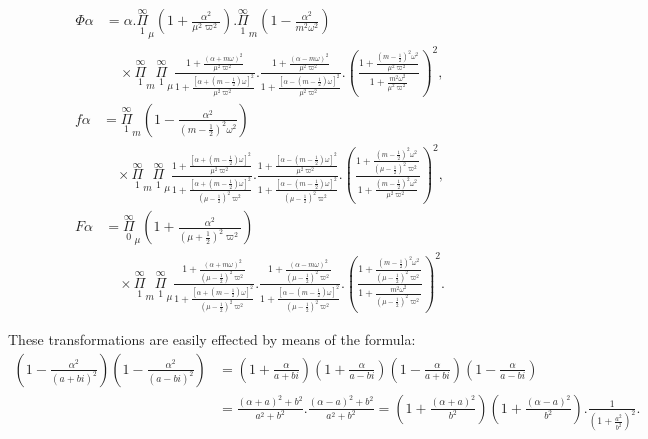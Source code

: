 \documentclass{article}
\begin{document}
\[
\begin{aligned}
\Phi\alpha &= \alpha.\overset{\infty}{\underset{1}{\Pi}}_{\mu}\left(1+\frac{\alpha^{2}}{\mu^{2}\varpi^{2}}\right).\overset{\infty}{\underset{1}{\Pi}}_{m}\left(1-\frac{\alpha^{2}}{m^{2}\omega^{2}}\right)\\
&\quad\times\overset{\infty}{\underset{1}{\Pi}}_{m}\overset{\infty}{\underset{1}{\Pi}}_{\mu}\frac{1+\frac{(\alpha+m\omega)^{2}}{\mu^{2}\varpi^{2}}}{1+\frac{[\alpha+(m-\tfrac{1}{2})\omega]^{2}}{\mu^{2}\varpi^{2}}}.\frac{1+\frac{(\alpha-m\omega)^{2}}{\mu^{2}\varpi^{2}}}{1+\frac{[\alpha-(m-\tfrac{1}{2})\omega]^{2}}{\mu^{2}\varpi^{2}}}.\left(\frac{1+\frac{(m-\tfrac{1}{2})^{2}\omega^{2}}{\mu^{2}\varpi^{2}}}{1+\frac{m^{2}\omega^{2}}{\mu^{2}\varpi^{2}}}\right)^{2},
\end{aligned}
\tag{178.}
\]
\[
\begin{aligned}
f\alpha &= \overset{\infty}{\underset{1}{\Pi}}_{m}\left(1-\frac{\alpha^{2}}{(m-\tfrac{1}{2})^{2}\omega^{2}}\right)\\
&\quad\times\overset{\infty}{\underset{1}{\Pi}}_{m}\overset{\infty}{\underset{1}{\Pi}}_{\mu}\frac{1+\frac{[\alpha+(m-\tfrac{1}{2})\omega]^{2}}{\mu^{2}\varpi^{2}}}{1+\frac{[\alpha+(m-\tfrac{1}{2})\omega]^{2}}{(\mu-\tfrac{1}{2})^{2}\varpi^{2}}}.\frac{1+\frac{[\alpha-(m-\tfrac{1}{2})\omega]^{2}}{\mu^{2}\varpi^{2}}}{1+\frac{[\alpha-(m-\tfrac{1}{2})\omega]^{2}}{(\mu-\tfrac{1}{2})^{2}\varpi^{2}}}.\left(\frac{1+\frac{(m-\tfrac{1}{2})^{2}\omega^{2}}{(\mu-\tfrac{1}{2})^{2}\varpi^{2}}}{1+\frac{(m-\tfrac{1}{2})^{2}\omega^{2}}{\mu^{2}\varpi^{2}}}\right)^{2},
\end{aligned}
\tag{179.}
\]
\[
\begin{aligned}
F\alpha &= \overset{\infty}{\underset{0}{\Pi}}_{\mu}\left(1+\frac{\alpha^{2}}{(\mu+\tfrac{1}{2})^{2}\varpi^{2}}\right)\\
&\quad\times\overset{\infty}{\underset{1}{\Pi}}_{m}\overset{\infty}{\underset{1}{\Pi}}_{\mu}\frac{1+\frac{(\alpha+m\omega)^{2}}{(\mu-\tfrac{1}{2})^{2}\varpi^{2}}}{1+\frac{[\alpha+(m-\tfrac{1}{2})\omega]^{2}}{(\mu-\tfrac{1}{2})^{2}\varpi^{2}}}.\frac{1+\frac{(\alpha-m\omega)^{2}}{(\mu-\tfrac{1}{2})^{2}\varpi^{2}}}{1+\frac{[\alpha-(m-\tfrac{1}{2})\omega]^{2}}{(\mu-\tfrac{1}{2})^{2}\varpi^{2}}}.\left(\frac{1+\frac{(m-\tfrac{1}{2})^{2}\omega^{2}}{(\mu-\tfrac{1}{2})^{2}\varpi^{2}}}{1+\frac{m^{2}\omega^{2}}{(\mu-\tfrac{1}{2})^{2}\varpi^{2}}}\right)^{2}.
\end{aligned}
\tag{180.}
\]

These transformations are easily effected by means of the formula:
\[
\begin{aligned}
\left(1-\frac{\alpha^{2}}{(a+bi)^{2}}\right)\left(1-\frac{\alpha^{2}}{(a-bi)^{2}}\right) &= \left(1+\frac{\alpha}{a+bi}\right)\left(1+\frac{\alpha}{a-bi}\right)\left(1-\frac{\alpha}{a+bi}\right)\left(1-\frac{\alpha}{a-bi}\right)\\
&= \frac{(\alpha+a)^{2}+b^{2}}{a^{2}+b^{2}}.\frac{(\alpha-a)^{2}+b^{2}}{a^{2}+b^{2}} = \left(1+\frac{(\alpha+a)^{2}}{b^{2}}\right)\left(1+\frac{(\alpha-a)^{2}}{b^{2}}\right).\frac{1}{\left(1+\frac{a^{2}}{b^{2}}\right)^{2}}.
\end{aligned}
\]
\end{document}
